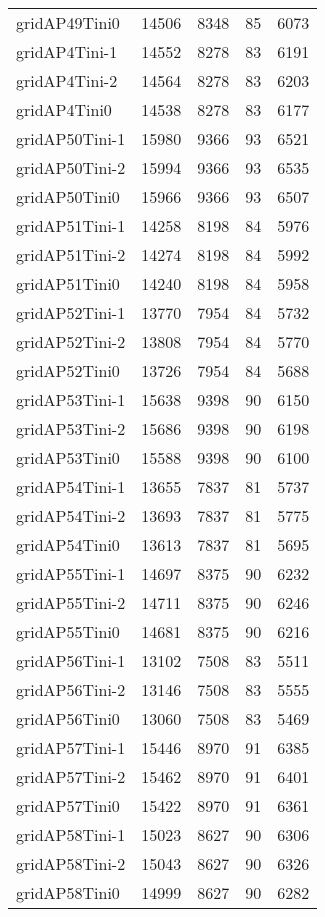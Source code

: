 \documentclass[../../../thesis.tex]{subfiles}
\begin{document}
\begin{longtable}{lrrrr}
gridAP49Tini0 & 14506 & 8348 & 85 & 6073 \\
gridAP4Tini-1 & 14552 & 8278 & 83 & 6191 \\
gridAP4Tini-2 & 14564 & 8278 & 83 & 6203 \\
gridAP4Tini0 & 14538 & 8278 & 83 & 6177 \\
gridAP50Tini-1 & 15980 & 9366 & 93 & 6521 \\
gridAP50Tini-2 & 15994 & 9366 & 93 & 6535 \\
gridAP50Tini0 & 15966 & 9366 & 93 & 6507 \\
gridAP51Tini-1 & 14258 & 8198 & 84 & 5976 \\
gridAP51Tini-2 & 14274 & 8198 & 84 & 5992 \\
gridAP51Tini0 & 14240 & 8198 & 84 & 5958 \\
gridAP52Tini-1 & 13770 & 7954 & 84 & 5732 \\
gridAP52Tini-2 & 13808 & 7954 & 84 & 5770 \\
gridAP52Tini0 & 13726 & 7954 & 84 & 5688 \\
gridAP53Tini-1 & 15638 & 9398 & 90 & 6150 \\
gridAP53Tini-2 & 15686 & 9398 & 90 & 6198 \\
gridAP53Tini0 & 15588 & 9398 & 90 & 6100 \\
gridAP54Tini-1 & 13655 & 7837 & 81 & 5737 \\
gridAP54Tini-2 & 13693 & 7837 & 81 & 5775 \\
gridAP54Tini0 & 13613 & 7837 & 81 & 5695 \\
gridAP55Tini-1 & 14697 & 8375 & 90 & 6232 \\
gridAP55Tini-2 & 14711 & 8375 & 90 & 6246 \\
gridAP55Tini0 & 14681 & 8375 & 90 & 6216 \\
gridAP56Tini-1 & 13102 & 7508 & 83 & 5511 \\
gridAP56Tini-2 & 13146 & 7508 & 83 & 5555 \\
gridAP56Tini0 & 13060 & 7508 & 83 & 5469 \\
gridAP57Tini-1 & 15446 & 8970 & 91 & 6385 \\
gridAP57Tini-2 & 15462 & 8970 & 91 & 6401 \\
gridAP57Tini0 & 15422 & 8970 & 91 & 6361 \\
gridAP58Tini-1 & 15023 & 8627 & 90 & 6306 \\
gridAP58Tini-2 & 15043 & 8627 & 90 & 6326 \\
gridAP58Tini0 & 14999 & 8627 & 90 & 6282 \\

\end{longtable}
\end{document}
